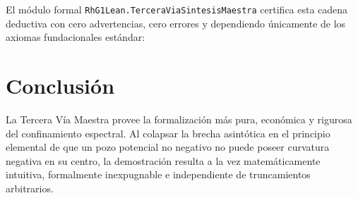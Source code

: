 \documentclass[11pt,a4paper]{article}
\begin{document}
El módulo formal \texttt{RhG1Lean.TerceraViaSintesisMaestra} certifica esta cadena deductiva con cero advertencias, cero errores y dependiendo únicamente de los axiomas fundacionales estándar:
\begin{center}
\end{center}

\section{Conclusión}
La Tercera Vía Maestra provee la formalización más pura, económica y rigurosa del confinamiento espectral. Al colapsar la brecha asintótica en el principio elemental de que un pozo potencial no negativo no puede poseer curvatura negativa en su centro, la demostración resulta a la vez matemáticamente intuitiva, formalmente inexpugnable e independiente de truncamientos arbitrarios.
\end{document}
